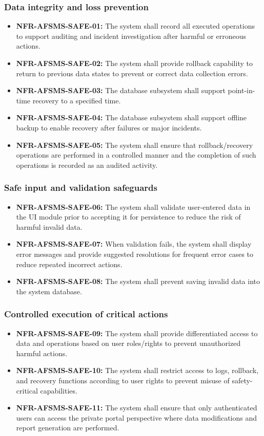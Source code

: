 \documentclass[11pt, a4paper]{article}
\begin{document}
\subsubsection{Data integrity and loss prevention}
\begin{itemize}
    \item \textbf{NFR-AFSMS-SAFE-01:} The system shall record all executed operations to support auditing and incident investigation after harmful or erroneous actions.
    \item \textbf{NFR-AFSMS-SAFE-02:} The system shall provide rollback capability to return to previous data states to prevent or correct data collection errors.
    \item \textbf{NFR-AFSMS-SAFE-03:} The database subsystem shall support point-in-time recovery to a specified time.
    \item \textbf{NFR-AFSMS-SAFE-04:} The database subsystem shall support offline backup to enable recovery after failures or major incidents.
    \item \textbf{NFR-AFSMS-SAFE-05:} The system shall ensure that rollback/recovery operations are performed in a controlled manner and the completion of such operations is recorded as an audited activity.
\end{itemize}

\subsubsection{Safe input and validation safeguards}
\begin{itemize}
    \item \textbf{NFR-AFSMS-SAFE-06:} The system shall validate user-entered data in the UI module prior to accepting it for persistence to reduce the risk of harmful invalid data.
    \item \textbf{NFR-AFSMS-SAFE-07:} When validation fails, the system shall display error messages and provide suggested resolutions for frequent error cases to reduce repeated incorrect actions.
    \item \textbf{NFR-AFSMS-SAFE-08:} The system shall prevent saving invalid data into the system database.
\end{itemize}

\subsubsection{Controlled execution of critical actions}
\begin{itemize}
    \item \textbf{NFR-AFSMS-SAFE-09:} The system shall provide differentiated access to data and operations based on user roles/rights to prevent unauthorized harmful actions.
    \item \textbf{NFR-AFSMS-SAFE-10:} The system shall restrict access to logs, rollback, and recovery functions according to user rights to prevent misuse of safety-critical capabilities.
    \item \textbf{NFR-AFSMS-SAFE-11:} The system shall ensure that only authenticated users can access the private portal perspective where data modifications and report generation are performed.
\end{itemize}
\end{document}
